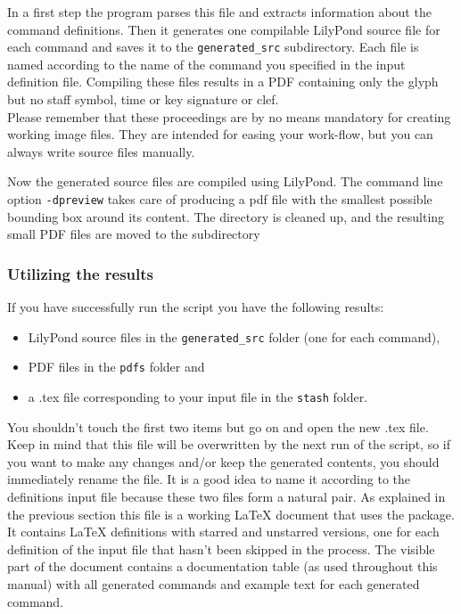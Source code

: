 \documentclass{article}
\begin{document}
In a first step the program parses this file and extracts information about the command definitions. Then it generates one compilable LilyPond source file for each command and saves it to the \texttt{generated\_src} subdirectory. 
Each file is named according to the name of the command you specified in the input definition file.
Compiling these files results in a PDF containing only the glyph but no staff symbol, time or key signature or clef.\\
Please remember that these proceedings are by no means mandatory for creating working image files.
They are intended for easing your work-flow, but you can always write source files manually.

Now the generated source files are compiled using LilyPond. 
The command line option \verb|-dpreview| takes care of producing a pdf file with the smallest possible bounding box around its content.
The directory is cleaned up, and the resulting small PDF files are moved to the subdirectory 


\subsubsection{Utilizing the results}
\label{subsubsec:BGI_utilizing_results}

If you have successfully run the script you have the following results:
\begin{itemize}
\item LilyPond source files in the \texttt{generated\_src} folder (one for each command),
\item PDF files in the \texttt{pdfs} folder and
\item a .tex file corresponding to your input file in the \texttt{stash} folder.
\end{itemize}
You shouldn't touch the first two items but go on and open the new .tex file.
Keep in mind that this file will be overwritten by the next run of the script, so if you want to make any changes and/or keep the generated contents, you should immediately rename the file.
It is a good idea to name it according to the definitions input file because these two files form a natural pair.
As explained in the previous section this file is a working \LaTeX{} document that uses the \lilyglyphs{} package.
It contains \LaTeX{}  definitions with starred and unstarred versions, one for each definition of the input file that hasn't been skipped in the process.
The visible part of the document contains a documentation table (as used throughout this manual) with all generated commands and example text for each generated command.
\end{document}
